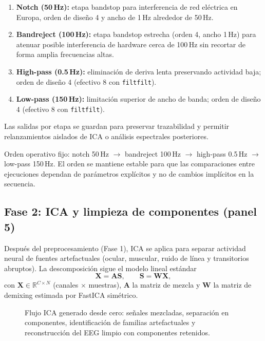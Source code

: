 \begin{enumerate}
\item \textbf{Notch (50\,Hz):} etapa bandstop para interferencia de red eléctrica en Europa, orden de diseño 4 y ancho de 1\,Hz alrededor de 50\,Hz.
\item \textbf{Bandreject (100\,Hz):} etapa bandstop estrecha (orden 4, ancho 1\,Hz) para atenuar posible interferencia de hardware cerca de 100\,Hz sin recortar de forma amplia frecuencias altas.
\item \textbf{High-pass (0.5\,Hz):} eliminación de deriva lenta preservando actividad baja; orden de diseño 4 (efectivo 8 con \texttt{filtfilt}).
\item \textbf{Low-pass (150\,Hz):} limitación superior de ancho de banda; orden de diseño 4 (efectivo 8 con \texttt{filtfilt}).
\end{enumerate}

Las salidas por etapa se guardan para preservar trazabilidad y permitir relanzamientos aislados de ICA o análisis espectrales posteriores.

\begin{parametros}
Orden operativo fijo: notch 50\,Hz $\rightarrow$ bandreject 100\,Hz $\rightarrow$ high-pass 0.5\,Hz $\rightarrow$ low-pass 150\,Hz. El orden se mantiene estable para que las comparaciones entre ejecuciones dependan de parámetros explícitos y no de cambios implícitos en la secuencia.
\end{parametros}

\subsection{Fase 2: ICA y limpieza de componentes (panel 5)}

Después del preprocesamiento (Fase 1), ICA se aplica para separar actividad neural de fuentes artefactuales (ocular, muscular, ruido de línea y transitorios abruptos). La descomposición sigue el modelo lineal estándar
\[
\mathbf{X}=\mathbf{A}\mathbf{S},\qquad \mathbf{S}=\mathbf{W}\mathbf{X},
\]
con $\mathbf{X}\in\mathbb{R}^{C\times N}$ (canales $\times$ muestras), $\mathbf{A}$ la matriz de mezcla y $\mathbf{W}$ la matriz de demixing estimada por FastICA simétrico.

\begin{fullwidth}
\begin{figure}[H]
\centering
\resizebox{0.9\fulltextwidth}{!}{\NSICAFlow}
\caption{Flujo ICA generado desde cero: señales mezcladas, separación en componentes, identificación de familias artefactuales y reconstrucción del EEG limpio con componentes retenidos.}
\label{fig:generated-ica-flow}
\end{figure}
\end{fullwidth}

